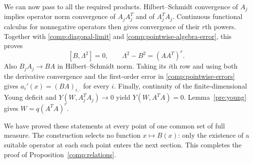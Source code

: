 We can now pass to all the required products.  Hilbert--Schmidt
convergence of $A_j$ implies operator norm convergence of
$A_jA_j^T$ and of $A_j^TA_j$.  Continuous functional calculus for
nonnegative operators then gives convergence of their $r$th powers.
Together with \eqref{comp:diagonal-limit} and
\eqref{comp:pointwise-algebra-error}, this proves
\[
 [B,\Lambda^2]=0,\qquad
 \Lambda^2-B^2=(AA^T)^r.
\]
Also $B_jA_j\to BA$ in Hilbert--Schmidt norm.  Taking its $i$th row
and using both the derivative convergence and the first-order error
in \eqref{comp:pointwise-errors} gives
$a_i'(x)=(BA)_{i,\cdot}$ for every $i$.  Finally, continuity of the
finite-dimensional Young deficit and
$Y(W,A_j^TA_j)\to0$ yield
$Y(W,A^TA)=0$.  Lemma~\ref{pre:young} gives
$W=q(A^TA)^r$.

We have proved these statements at every point of one common set of
full measure.  The construction selects no function $x\mapsto B(x)$:
only the existence of a suitable operator at each such point enters
the next section.  This completes the proof of
Proposition~\ref{comp:relations}.
